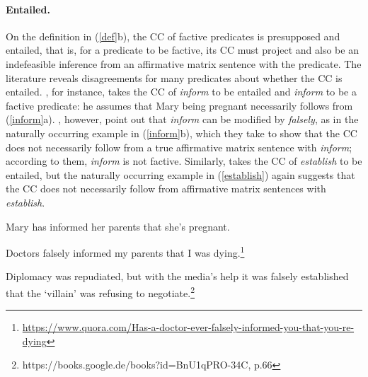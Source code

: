 \documentclass[11pt,fleqn]{article}
\newcommand{\6}{\mbox{$[\hspace*{-.6mm}[$}}
\newcommand{\9}{\mbox{$]\hspace*{-.6mm}]$}}
\begin{document}
\paragraph{Entailed.} On the definition in (\ref{def}b), the CC of factive predicates is presupposed and entailed, that is, for a predicate to be factive, its CC must project and also be an indefeasible inference from an affirmative matrix sentence with the predicate. The literature reveals disagreements for many predicates about whether the CC is entailed. \citet[139]{schlenker10}, for instance, takes the CC of {\em inform} to be entailed and {\em inform} to be a factive predicate: he assumes that Mary being pregnant necessarily follows from (\ref{inform}a). \citet[76]{anand-hacquard2014}, however, point out that {\em inform} can be modified by {\em falsely}, as in the naturally occurring example in (\ref{inform}b), which they take to show that the CC does not necessarily follow from a true affirmative matrix sentence with {\em inform}; according to them, {\em inform} is not factive. Similarly, \citet{swanson2012} takes the CC of {\em establish} to be entailed, but the naturally occurring example in (\ref{establish}) again suggests that the CC does not necessarily follow from affirmative matrix sentences with {\em establish}.

\begin{exe}
\ex\label{inform} 

\begin{xlist}

\ex Mary has informed her parents that she's pregnant.

\ex Doctors falsely informed my parents that I was dying.\footnote{\url{https://www.quora.com/Has-a-doctor-ever-falsely-informed-you-that-you-re-dying}}

\end{xlist}

\ex\label{establish} Diplomacy was repudiated, but with the media's help it was falsely established that the `villain' was refusing to negotiate.\footnote{https://books.google.de/books?id=BnU1qPRO-34C, p.66}
\end{exe}



\end{document}
